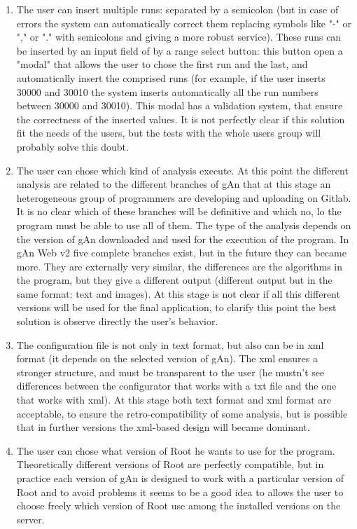 \begin{enumerate}

\item The user can insert multiple runs: separated by a semicolon (but in case of errors the system can automatically correct them replacing symbols like "-" or "," or "." with semicolons and giving a more robust service). These runs can be inserted by an input field of by a range select button: this button open a "modal" that allows the user to chose the first run and the last, and automatically insert the comprised runs (for example, if the user inserts 30000 and 30010 the system inserts automatically all the run numbers between 30000 and 30010). This modal has a validation system, that ensure the correctness of the inserted values. It is not perfectly clear if this solution fit the needs of the users, but the tests with the whole users group will probably solve this doubt. 

\item The user can chose which kind of analysis execute. At this point the different analysis are related to the different branches of gAn that at this stage an heterogeneous group of programmers are developing and uploading on Gitlab. It is no clear which of these branches will be definitive and which no, lo the program must be able to use all of them. The type of the analysis depends on the version of gAn downloaded and used for the execution of the program. In gAn Web v2 five complete branches exist, but in the future they can became more. They are externally very similar, the differences are the algorithms in the program, but they give a different output (different output but in the same format: text and images). 
At this stage is not clear if all this different versions will be used for the final application, to clarify this point the best solution is observe directly the user's behavior. 

\item The configuration file is not only in text format, but also can be in xml format (it depends on the selected version of gAn). The xml ensures a stronger structure, and must be transparent to the user (he mustn't see differences between the configurator that works with a txt file and the one that works with xml). At this stage both text format and xml format are acceptable, to ensure the retro-compatibility of some analysis, but is possible that in further versions the xml-based design will became dominant. 

\item The user can chose what version of Root he wants to use for the program. Theoretically different versions of Root are perfectly compatible, but in practice each version of gAn is designed to work with a particular version of Root and to avoid problems it seems to be a good idea to allows the user to choose freely which version of Root use among the installed versions on the server.  


\end{enumerate}
